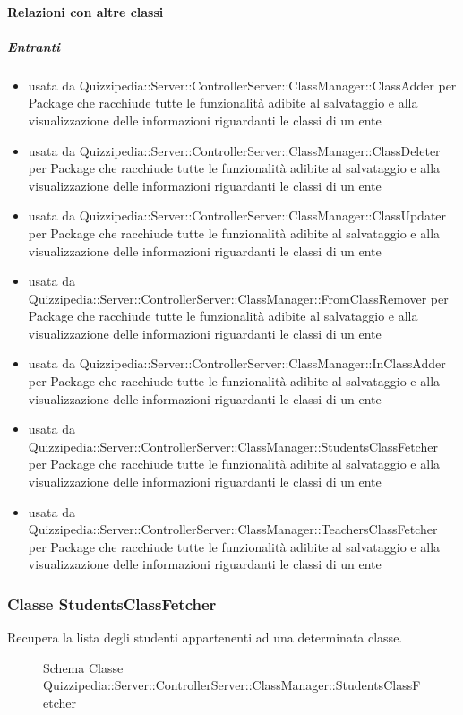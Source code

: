 \paragraph{Relazioni con altre classi}
\subparagraph{Entranti}
\begin{itemize}
\item usata da Quizzipedia::Server::ControllerServer::ClassManager::ClassAdder per Package che racchiude tutte le funzionalità adibite al salvataggio e alla visualizzazione delle informazioni riguardanti le classi di un ente
\item usata da Quizzipedia::Server::ControllerServer::ClassManager::ClassDeleter per Package che racchiude tutte le funzionalità adibite al salvataggio e alla visualizzazione delle informazioni riguardanti le classi di un ente
\item usata da Quizzipedia::Server::ControllerServer::ClassManager::ClassUpdater per Package che racchiude tutte le funzionalità adibite al salvataggio e alla visualizzazione delle informazioni riguardanti le classi di un ente
\item usata da Quizzipedia::Server::ControllerServer::ClassManager::FromClassRemover per Package che racchiude tutte le funzionalità adibite al salvataggio e alla visualizzazione delle informazioni riguardanti le classi di un ente
\item usata da Quizzipedia::Server::ControllerServer::ClassManager::InClassAdder per Package che racchiude tutte le funzionalità adibite al salvataggio e alla visualizzazione delle informazioni riguardanti le classi di un ente
\item usata da Quizzipedia::Server::ControllerServer::ClassManager::StudentsClassFetcher per Package che racchiude tutte le funzionalità adibite al salvataggio e alla visualizzazione delle informazioni riguardanti le classi di un ente
\item usata da Quizzipedia::Server::ControllerServer::ClassManager::TeachersClassFetcher per Package che racchiude tutte le funzionalità adibite al salvataggio e alla visualizzazione delle informazioni riguardanti le classi di un ente
\end{itemize}
\subsubsection{Classe StudentsClassFetcher}
Recupera la lista degli studenti appartenenti ad una determinata classe.
\begin{figure}[H]
\centering
\noindent{}
\caption[Schema Classe StudentsClassFetcher]{Schema Classe Quizzipedia::Server::ControllerServer::ClassManager::StudentsClassFetcher}
\end{figure}
